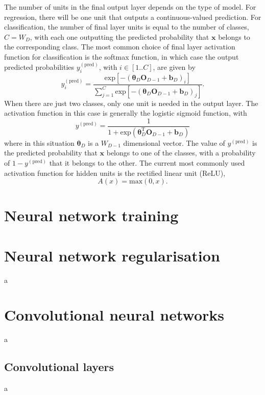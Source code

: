 \documentclass[12pt]{article}
\begin{document}
The number of units in the final output layer depends on the type of model. For regression, there will be one unit that outputs a continuous-valued prediction. For classification, the number of final layer units is equal to the number of classes, $C=W_D$, with each one outputting the predicted probability that $\bm{x}$ belongs to the corresponding class. The most common choice of final layer activation function for classification is the softmax function, in which case the output predicted probabilities $y_i^{(\mathrm{pred})}$, with $i\in[1..C]$, are given by
\begin{equation}
y_i^{(\mathrm{pred})}=\frac{\mathrm{exp}\left[-\left(\boldsymbol\theta_D\bm{O}_{D-1}+\bm{b}_D\right)_i\right]}{\sum_{j=1}^{C}\mathrm{exp}\left[-\left(\boldsymbol\theta_D\bm{O}_{D-1}+\bm{b}_D\right)_j\right]}.
\end{equation} 
When there are just two classes, only one unit is needed in the output layer. The activation function in this case is generally the logistic sigmoid function, with
\begin{equation}
y^{(\mathrm{pred})}=\frac{1}{1+\mathrm{exp}\left(\boldsymbol\theta_D^\mathrm{T}\bm{O}_{D-1}+\bm{b}_D\right)}
\end{equation}
where in this situation $\boldsymbol\theta_D$ is a $W_{D-1}$ dimensional vector. The value of $y^{(\mathrm{pred})}$ is the predicted probability that $\bm{x}$ belongs to one of the classes, with a probability of $1-y^{(\mathrm{pred})}$ that it belongs to the other. The current most commonly used activation function for hidden units is the rectified linear unit (ReLU),
\begin{equation}
A(x)=\mathrm{max}(0,x).
\end{equation}

\section{Neural network training}

\section{Neural network regularisation}
a
\section{Convolutional neural networks}
a
\subsection{Convolutional layers}
a
\end{document}
